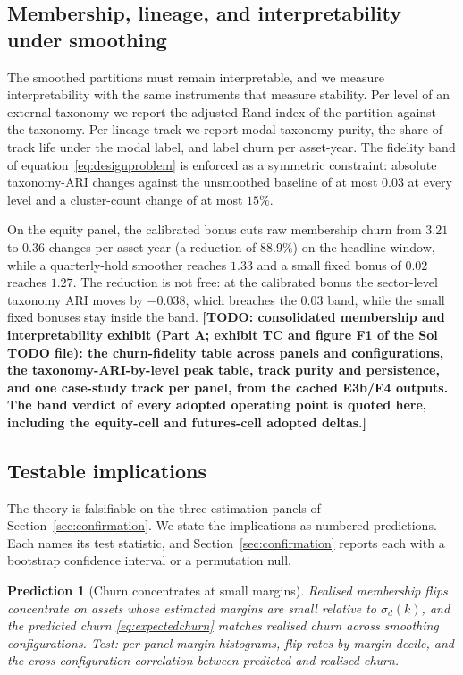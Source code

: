 \documentclass[11pt]{article}
\newtheorem{prediction}{Prediction}
\theoremstyle{remark}
\newcommand{\TODO}[1]{\textbf{[TODO: #1]}}
\begin{document}
\subsection{Membership, lineage, and interpretability under smoothing}
\label{sec:membership}

The smoothed partitions must remain interpretable, and we measure
interpretability with the same instruments that measure stability. Per level
of an external taxonomy we report the adjusted Rand index of the partition
against the taxonomy. Per lineage track we report modal-taxonomy purity, the
share of track life under the modal label, and label churn per asset-year. The
fidelity band of equation~\eqref{eq:designproblem} is enforced as a symmetric
constraint: absolute taxonomy-ARI changes against the unsmoothed baseline of
at most $0.03$ at every level and a cluster-count change of at most $15\%$.

On the equity panel, the calibrated bonus cuts raw membership churn from
$3.21$ to $0.36$ changes per asset-year (a reduction of 88.9\%) on the
headline window, while a quarterly-hold smoother reaches $1.33$ and a small
fixed bonus of $0.02$ reaches $1.27$. The reduction is not free: at the
calibrated bonus the sector-level taxonomy ARI moves by $-0.038$, which
breaches the $0.03$ band, while the small fixed bonuses stay inside the band.
\TODO{consolidated membership and interpretability exhibit (Part A; exhibit
TC and figure F1 of the Sol TODO file): the churn-fidelity table across
panels and configurations, the taxonomy-ARI-by-level peak table, track purity
and persistence, and one case-study track per panel, from the cached E3b/E4
outputs. The band verdict of every adopted operating point is quoted here,
including the equity-cell and futures-cell adopted deltas.}

\subsection{Testable implications}
\label{sec:predictions}

The theory is falsifiable on the three estimation panels of
Section~\ref{sec:confirmation}. We state the implications as numbered
predictions. Each names its test statistic, and Section~\ref{sec:confirmation}
reports each with a bootstrap confidence interval or a permutation null.

\begin{prediction}[Churn concentrates at small margins]
\label{pred:margins}
Realised membership flips concentrate on assets whose estimated margins are
small relative to $\sigma_d(k)$, and the predicted churn
\eqref{eq:expectedchurn} matches realised churn across smoothing
configurations. Test: per-panel margin histograms, flip rates by margin
decile, and the cross-configuration correlation between predicted and realised
churn.
\end{prediction}
\end{document}
